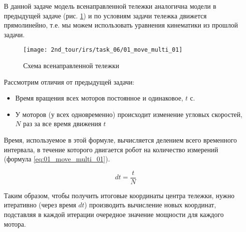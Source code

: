 \solutionSection

В данной задаче модель всенаправленной тележки аналогична модели в предыдущей задаче (рис. \ref{fig:01_move_multi_01}) и по условиям задачи тележка движется прямолинейно, т.е. мы можем использовать уравнения кинематики из прошлой задачи. 

\begin{figure}[h!]
	\centering
	\texttt{[image: 2nd\_tour/irs/task\_06/01\_move\_multi\_01]}
	\caption{Схема всенаправленной тележки}
	\label{fig:01_move_multi_01}
\end{figure}

Рассмотрим отличия от предыдущей задачи:
\begin{itemize}
	\item Время вращения всех моторов постоянное и одинаковое, $t$ с.
	\item У моторов (у всех одновременно) происходит изменение угловых скоростей, $N$ раз за все время движения $t$
\end{itemize}

Время, используемое в этой формуле, вычисляется делением всего временного интервала, в течение которого двигается робот на количество измерений (формула \ref{eq:01_move_multi_01}).

\begin{equation}
	dt = \frac{t}{N}
	\label{eq:01_move_multi_01}
\end{equation}

Таким образом, чтобы получить итоговые координаты центра тележки, нужно итеративно (через время $dt$) производить вычисление новых координат, подставляя в каждой итерации очередное значение мощности для каждого мотора.

\codeExample

{}
